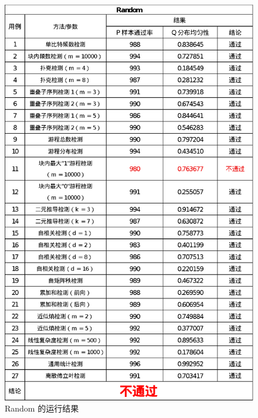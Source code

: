 \documentclass[12pt,a4paper]{article}%
\begin{document}
\begin{figure}[h]
    \centering
    \begin{minipage}{0.42\textwidth}
        \centering
        \includegraphics[width=\linewidth]{Random}
        \caption{Random 的运行结果}
        \label{fig:img4}
    \end{minipage}\hfill
    \begin{minipage}{0.42\textwidth}
        \centering

\end{minipage}
\end{figure}
\end{document}
